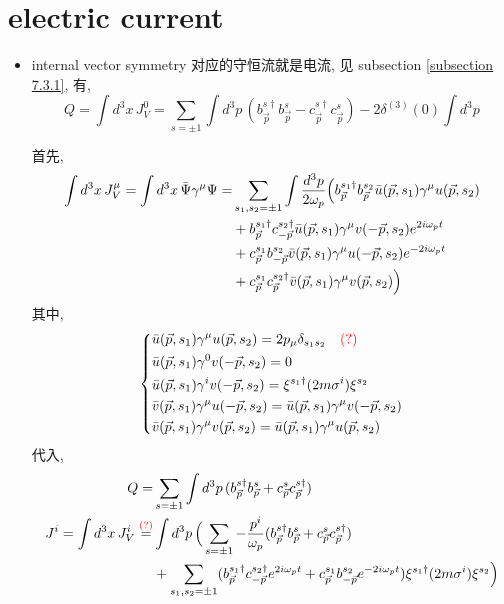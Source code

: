 \section{electric current}
\begin{itemize}
	\item internal vector symmetry 对应的守恒流就是电流, 见 subsection \ref{subsection 7.3.1}, 有,
	\begin{equation}
		Q = \int d^3 x \, J_V^0 = \sum_{s = \pm 1} \int d^3 p \, (b^{s \dag}_{\vec{p}} b^s_{\vec{p}} - c^{s \dag}_{\vec{p}} c^s_{\vec{p}}) - 2 \delta^{(3)}(0) \int d^3 p
	\end{equation}
	
	\begin{tcolorbox}[title=calculation:]
		首先,
		\begin{align}
			\int d^3 x \, J_V^\mu = \int d^3 x \, \bar{\Psi} \gamma^\mu \Psi =& \sum_{s_1, s_2 = \pm 1} \int \frac{d^3 p}{2 \omega_p} \Big( b^{s_1 \dag}_{\vec{p}} b^{s_2}_{\vec{p}} \bar{u}(\vec{p}, s_1) \gamma^\mu u(\vec{p}, s_2) \notag \\
			& + b^{s_1 \dag}_{\vec{p}} c^{s_2 \dag}_{- \vec{p}} \bar{u}(\vec{p}, s_1) \gamma^\mu v(- \vec{p}, s_2) e^{2 i \omega_p t} \notag \\
			& + c^{s_1}_{\vec{p}} b^{s_2}_{- \vec{p}} \bar{v}(\vec{p}, s_1) \gamma^\mu u(- \vec{p}, s_2) e^{- 2 i \omega_p t} \notag \\
			& + c^{s_1}_{\vec{p}} c^{s_2 \dag}_{\vec{p}} \bar{v}(\vec{p}, s_1) \gamma^\mu v(\vec{p}, s_2) \Big)
		\end{align}
		其中,
		\begin{equation}
			\begin{dcases}
				\bar{u}(\vec{p}, s_1) \gamma^\mu u(\vec{p}, s_2) = 2 p_\mu \delta_{s_1 s_2} \quad \textcolor{red}{(?)} \\
				\bar{u}(\vec{p}, s_1) \gamma^0 v(- \vec{p}, s_2) = 0 \\
				\bar{u}(\vec{p}, s_1) \gamma^i v(- \vec{p}, s_2) = \xi^{s_1 \dag} (2 m \sigma^i) \xi^{s_2} \\
				\bar{v}(\vec{p}, s_1) \gamma^\mu u(- \vec{p}, s_2) = \bar{u}(\vec{p}, s_1) \gamma^\mu v(- \vec{p}, s_2) \\
				\bar{v}(\vec{p}, s_1) \gamma^\mu v(\vec{p}, s_2) = \bar{u}(\vec{p}, s_1) \gamma^\mu u(\vec{p}, s_2)
			\end{dcases}
		\end{equation}
		代入,
		\begin{align}
			Q =& \sum_{s = \pm 1} \int d^3 p \, (b^{s \dag}_{\vec{p}} b^s_{\vec{p}} + c^s_{\vec{p}} c^{s \dag}_{\vec{p}}) \\
			J^i = \int d^3 x \, J_V^i \overset{\textcolor{red}{(?)}}{=}& \int d^3 p \, \Big( \sum_{s = \pm 1} - \frac{p^i}{\omega_p} (b^{s \dag}_{\vec{p}} b^s_{\vec{p}} + c^s_{\vec{p}} c^{s \dag}_{\vec{p}}) \notag \\
			& + \sum_{s_1, s_2 = \pm 1} (b^{s_1 \dag}_{\vec{p}} c^{s_2 \dag}_{- \vec{p}} e^{2 i \omega_p t} + c^{s_1}_{\vec{p}} b^{s_2}_{- \vec{p}} e^{- 2 i \omega_p t}) \xi^{s_1 \dag} (2 m \sigma^i) \xi^{s_2} \Big)
		\end{align}
	\end{tcolorbox}
\end{itemize}

